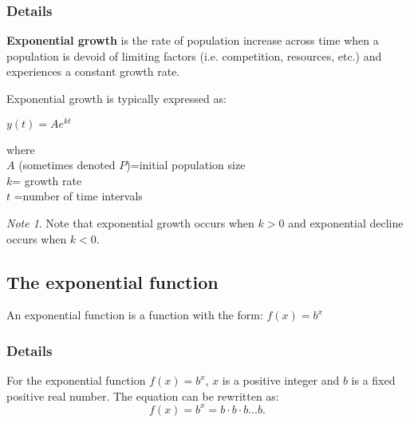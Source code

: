 \documentclass[12pt,a4paper]{article}
\theoremstyle{regla}
\theoremstyle{remark}
\newtheorem{notes}{Note}[section]
\theoremstyle{definition}
\theoremstyle{nonumberbreak}
\begin{document}
\subsubsection{Details}
\begin{defn}
{\bf Exponential growth} is the rate of population increase across time when a population is devoid of limiting factors (i.e. competition, resources, etc.) and experiences a constant growth rate.
\end{defn}

 Exponential growth is typically expressed as:

$y(t)=Ae^{kt}$

where \\
$A$ (sometimes denoted $P$)=initial population size\\
$k$= growth rate\\
$t$ =number of time intervals\\

\begin{notes}
Note that exponential growth occurs when $k>0$ and exponential decline occurs when $k<0$.
\end {notes}


\subsection{The exponential function}
\begin{fbox}
\begin{minipage}{0.97\textwidth}
An exponential function is a function with the form:
$f(x)=b^x$


\end{minipage}
\end{fbox}
\subsubsection{Details}
For the exponential function $f(x)=b^x$, $x$ is a positive integer and $b$ is a fixed positive real number.  The equation can be rewritten as:
$$f(x)=b^x=b\cdot b \cdot b...b.$$
\end{document}
